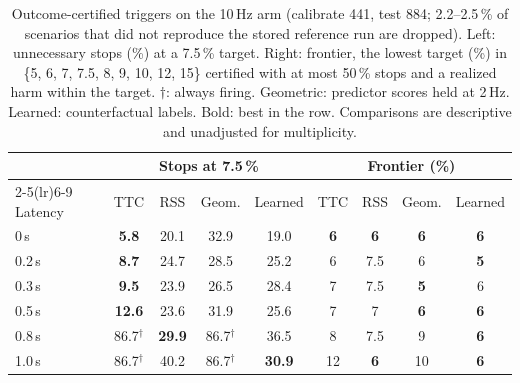 \documentclass[lettersize,journal]{IEEEtran}
\begin{document}
\begin{table}[t]
\caption{Outcome-certified triggers on the 10\,Hz arm (calibrate 441, test 884; 2.2--2.5\,\% of
scenarios that did not reproduce the stored reference run are dropped). Left:
unnecessary stops (\%) at a 7.5\,\% target. Right: frontier, the lowest target (\%)
in \{5, 6, 7, 7.5, 8, 9, 10, 12, 15\} certified with at most 50\,\% stops and a
realized harm within the target. $\dagger$: always firing. Geometric: predictor
scores held at 2\,Hz. Learned: counterfactual labels. Bold: best in the row. Comparisons are descriptive and unadjusted for multiplicity.}
\label{tab:outcome}
\centering
\scriptsize\setlength{\tabcolsep}{2.6pt}
\begin{tabular}{lcccccccc}
\toprule
 & \multicolumn{4}{c}{Stops at 7.5\,\%} & \multicolumn{4}{c}{Frontier (\%)} \\
\cmidrule(lr){2-5}\cmidrule(lr){6-9}
Latency & TTC & RSS & Geom. & Learned & TTC & RSS & Geom. & Learned \\
\midrule
0\,s & \textbf{5.8} & 20.1 & 32.9 & 19.0 & \textbf{6} & \textbf{6} & \textbf{6} & \textbf{6} \\
0.2\,s & \textbf{8.7} & 24.7 & 28.5 & 25.2 & 6 & 7.5 & 6 & \textbf{5} \\
0.3\,s & \textbf{9.5} & 23.9 & 26.5 & 28.4 & 7 & 7.5 & \textbf{5} & 6 \\
0.5\,s & \textbf{12.6} & 23.6 & 31.9 & 25.6 & 7 & 7 & \textbf{6} & \textbf{6} \\
0.8\,s & 86.7$^\dagger$ & \textbf{29.9} & 86.7$^\dagger$ & 36.5 & 8 & 7.5 & 9 & \textbf{6} \\
1.0\,s & 86.7$^\dagger$ & 40.2 & 86.7$^\dagger$ & \textbf{30.9} & 12 & \textbf{6} & 10 & \textbf{6} \\
\bottomrule
\end{tabular}
\end{table}
\end{document}
